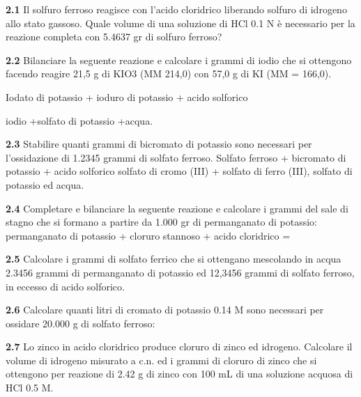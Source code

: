 \textbf{2.1} Il solfuro ferroso reagisce con l'acido cloridrico liberando solfuro di idrogeno allo stato gassoso. Quale volume di una soluzione di HCl 0.1 N è necessario per la reazione completa con 5.4637 gr di solfuro ferroso?

\vspace{0.2cm}\textbf{2.2} Bilanciare la  seguente reazione e calcolare i grammi di iodio che si ottengono facendo reagire 21,5 g di KIO3 (MM 214,0) con 57,0 g di KI (MM = 166,0).

\vspace{0.2cm}
\begin{center}Iodato di potassio + ioduro di potassio + acido solforico \ce{->}

\ce{->}iodio +solfato di potassio +acqua. 
\end{center}

\vspace{0.2cm}\textbf{2.3} Stabilire quanti grammi di bicromato di potassio sono necessari per l’ossidazione di 1.2345 grammi di solfato ferroso.
Solfato ferroso + bicromato di potassio + acido solforico \ce{->} solfato di cromo (III) + solfato di ferro (III), solfato di potassio ed acqua. 


\vspace{0.2cm}\textbf{2.4} Completare e bilanciare la seguente reazione e calcolare i grammi del sale di stagno che si formano a partire da 1.000 gr di permanganato di potassio: 
permanganato di potassio + cloruro stannoso + acido cloridrico =

\vspace{0.2cm}\textbf{2.5} Calcolare i grammi di solfato ferrico che si ottengano mescolando in acqua 2.3456 grammi di permanganato di potassio  ed 12,3456 grammi di solfato ferroso, in eccesso di acido solforico.

\vspace{0.2cm}\textbf{2.6} Calcolare quanti litri di cromato di potassio 0.14 M sono necessari per ossidare 20.000 g di solfato ferroso:
\begin{center}

\end{center}

\vspace{0.2cm}\textbf{2.7} Lo zinco in acido cloridrico produce cloruro di zinco ed idrogeno. Calcolare il volume di
idrogeno misurato a c.n. ed i grammi di cloruro di zinco che si ottengono per reazione di 2.42 g di
zinco con 100 mL di una soluzione acquosa di HCl 0.5 M.

